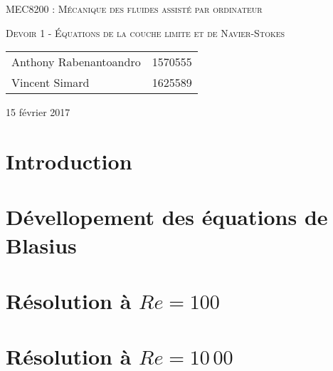 \documentclass[12pt, letterpaper]{article}
\begin{document}
\begin{titlepage}
	\centering
    {\scshape\Large
	MEC8200 : Mécanique  des fluides assisté par ordinateur \par
    }
    \vspace{4cm}
    {\scshape\LARGE
	Devoir 1 - Équations de la couche limite et de Navier-Stokes \par
	}
    \vspace{4cm}
    {\Large
	\begin{tabular}{ll}
		Anthony Rabenantoandro & 1570555 \\
		Vincent Simard & 1625589 \\
	\end{tabular}
	}
    \vfill
    {\Large
    15 février 2017
    }
\end{titlepage}
\newpage
\tableofcontents
\listoffigures
\listoftables
\newpage


\section{Introduction}
	
	
\section{Dévellopement des équations de Blasius}
	

\section{Résolution à $Re=100$}
	
	
\section{Résolution à $Re=10\,00$}
	
	
\end{document}
